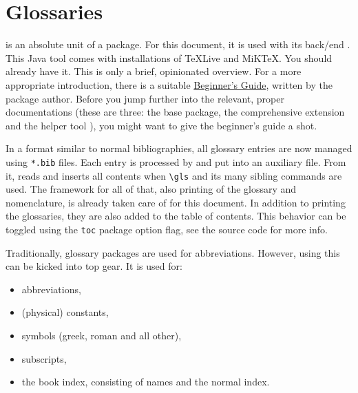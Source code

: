 \section{Glossaries}
\label{ch:glossaries}

 is an absolute unit of a package.
For this document, it is used with its back\-/end .
This Java tool comes with installations of TeXLive and MiKTeX.
You should already have it.
This  is only a brief, opinionated overview.
For a more appropriate introduction, there is a suitable
\href{http://tug.ctan.org/macros/latex/contrib/glossaries/glossariesbegin.pdf}{Beginner's Guide},
written by the package author.
Before you jump further into the relevant, proper documentations (these are three: the
 base package, the comprehensive extension
 and the helper tool ), you might
want to give the beginner's guide a shot.

In a format similar to normal bibliographies, all glossary entries are now managed
using \texttt{*.bib} files.
Each entry is processed by  and put into an auxiliary file.
From it,  reads and inserts all contents when \verb|\gls|
and its many sibling commands are used.
The framework for all of that, also printing of the glossary and nomenclature,
is already taken care of for this document.
In addition to printing the glossaries, they are also added to the table of contents.
This behavior can be toggled using the \texttt{toc} package option flag,
see the source code for more info.

Traditionally, glossary packages are used for abbreviations.
However, using  this can be kicked into top gear.
It is used for:
\begin{itemize}
    \item abbreviations,
    \item (physical) constants,
    \item symbols (greek, roman and all other),
    \item subscripts,
    \item the book index, consisting of names and the normal index.
\end{itemize}

